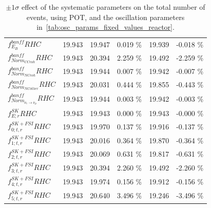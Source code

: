 {\begin{table}
\begin{tabular}{| l | r | r  r | r  r |}
                           $f_{E_{B}}^{banff} RHC$ & 19.943 & 19.947 &   0.019 \%  &  19.939 &  -0.018 \%  \\ 
                    $f_{Norm_{CCcoh}}^{banff} RHC$ & 19.943 & 20.394 &   2.259 \%  &  19.492 &  -2.259 \%  \\ 
                    $f_{Norm_{NCcoh}}^{banff} RHC$ & 19.943 & 19.944 &   0.007 \%  &  19.942 &  -0.007 \%  \\ 
                  $f_{Norm_{NCother}}^{banff} RHC$ & 19.943 & 20.031 &   0.444 \%  &  19.855 &  -0.443 \%  \\ 
$f_{Norm_{\nu_e \rightarrow \nu_\mu}}^{banff} RHC$ & 19.943 & 19.944 &   0.003 \%  &  19.942 &  -0.003 \%  \\   \hline
                                $f_{E; r}^{SK}RHC$ & 19.943 & 19.943 &   0.000 \%  &  19.943 &  -0.000 \%  \\ 
                         $f_{0; t, r}^{SK+FSI}RHC$ & 19.943 & 19.970 &   0.137 \%  &  19.916 &  -0.137 \%  \\ 
                         $f_{1; t, r}^{SK+FSI}RHC$ & 19.943 & 20.016 &   0.364 \%  &  19.870 &  -0.364 \%  \\ 
                         $f_{2; t, r}^{SK+FSI}RHC$ & 19.943 & 20.069 &   0.631 \%  &  19.817 &  -0.631 \%  \\ 
                         $f_{3; t, r}^{SK+FSI}RHC$ & 19.943 & 20.394 &   2.260 \%  &  19.492 &  -2.260 \%  \\ 
                         $f_{4; t, r}^{SK+FSI}RHC$ & 19.943 & 19.974 &   0.156 \%  &  19.912 &  -0.156 \%  \\ 
                         $f_{5; t, r}^{SK+FSI}RHC$ & 19.943 & 20.640 &   3.496 \%  &  19.246 &  -3.496 \%  \\ 
\hline
\end{tabular}

\caption{
 $\pm 1 \sigma$ effect of the systematic parameters on the total number of events,
 using \TotalPot POT, and the oscillation parameters in~\ref{tab:osc_params_fixed_values_reactor}.
}
\label{tab:onesigmaeffects}
\end{table}

}
